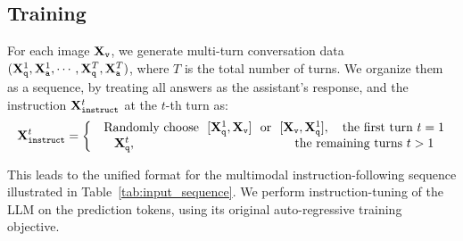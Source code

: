 \subsection{Training}

  


For each image ${{\bf X}}_{\texttt{v}}$, we generate multi-turn conversation data 
$({{\bf X}}_{\texttt{q}}^1, {{\bf X}}_{\texttt{a}}^1, \cdots, {{\bf X}}_{\texttt{q}}^T, {{\bf X}}_{\texttt{a}}^T )$, where $T$ is the total number of turns. 
We organize them as a sequence, by treating all answers as the assistant's response, and the instruction ${{\bf X}}_{\texttt{instruct}}^t $ at the $t$-th turn as:  
\begin{align} \label{eq:organize_data_turn_rule}
 \Xmat_{\texttt{instruct}}^t = 
\left\{\begin{matrix}
& \text{Randomly choose}~~
[\Xmat_{\texttt{q}}^1, \Xmat_{\texttt{v}}] ~~\text{or}~~ [ \Xmat_{\texttt{v}}, \Xmat_{\texttt{q}}^1] ,  ~~~\text{the first turn}~t=1 \\ 
& \Xmat_{\texttt{q}}^t, \hspace{45mm} \text{the remaining turns}~t>1
\end{matrix}\right.
\end{align}

This leads to the unified format for the multimodal instruction-following sequence illustrated in Table~\ref{tab:input_sequence}.  We perform instruction-tuning of the LLM on the prediction tokens, using its original auto-regressive training objective.   



